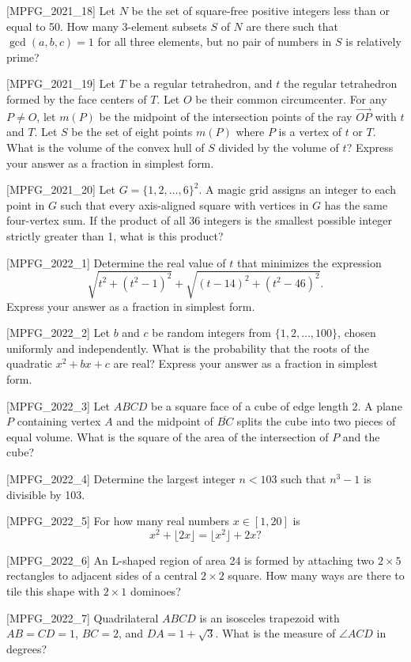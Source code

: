 [MPFG_2021_18]
Let $N$ be the set of square-free positive integers less than or equal to 50. How many 3-element subsets $S$ of $N$ are there such that $\gcd(a, b, c) = 1$ for all three elements, but no pair of numbers in $S$ is relatively prime?

[MPFG_2021_19]
Let $T$ be a regular tetrahedron, and $t$ the regular tetrahedron formed by the face centers of $T$. Let $O$ be their common circumcenter. For any $P \ne O$, let $m(P)$ be the midpoint of the intersection points of the ray $\vec{OP}$ with $t$ and $T$. Let $S$ be the set of eight points $m(P)$ where $P$ is a vertex of $t$ or $T$. What is the volume of the convex hull of $S$ divided by the volume of $t$? Express your answer as a fraction in simplest form.

[MPFG_2021_20]
Let $G = \{1, 2, \dots, 6\}^2$. A magic grid assigns an integer to each point in $G$ such that every axis-aligned square with vertices in $G$ has the same four-vertex sum. If the product of all 36 integers is the smallest possible integer strictly greater than 1, what is this product?

[MPFG_2022_1]
Determine the real value of $t$ that minimizes the expression
$$\sqrt{t^2 + (t^2 - 1)^2} + \sqrt{(t - 14)^2 + (t^2 - 46)^2}.$$
Express your answer as a fraction in simplest form.

[MPFG_2022_2]
Let $b$ and $c$ be random integers from $\{1, 2, \dots, 100\}$, chosen uniformly and independently. What is the probability that the roots of the quadratic $x^2 + bx + c$ are real? Express your answer as a fraction in simplest form.

[MPFG_2022_3]
Let $ABCD$ be a square face of a cube of edge length 2. A plane $P$ containing vertex $A$ and the midpoint of $\overline{BC}$ splits the cube into two pieces of equal volume. What is the square of the area of the intersection of $P$ and the cube?

[MPFG_2022_4]
Determine the largest integer $n < 103$ such that $n^3 - 1$ is divisible by 103.

[MPFG_2022_5]
For how many real numbers $x \in [1, 20]$ is
$$x^2 + \lfloor 2x \rfloor = \lfloor x^2 \rfloor + 2x?$$

[MPFG_2022_6]
An L-shaped region of area 24 is formed by attaching two $2 \times 5$ rectangles to adjacent sides of a central $2 \times 2$ square. How many ways are there to tile this shape with $2 \times 1$ dominoes?

[MPFG_2022_7]
Quadrilateral $ABCD$ is an isosceles trapezoid with $AB = CD = 1$, $BC = 2$, and $DA = 1 + \sqrt{3}$. What is the measure of $\angle ACD$ in degrees?

